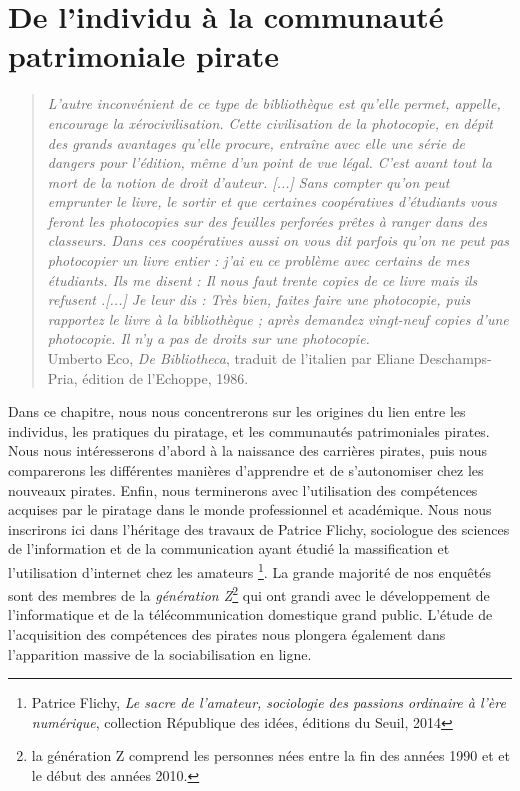 \chapter{De l'individu à la communauté patrimoniale pirate}

\begin{quote}
    \textit{L'autre inconvénient de ce type de bibliothèque est qu'elle permet, appelle, encourage la xérocivilisation. Cette civilisation de la photocopie, en dépit des grands avantages qu'elle procure, entraîne avec elle une série de dangers pour l'édition, même d'un point de vue légal. C'est avant tout la mort de la notion de droit d'auteur. [...] Sans compter qu'on peut emprunter le livre, le sortir et que certaines coopératives d'étudiants vous feront les photocopies sur des feuilles perforées prêtes à ranger dans des classeurs. Dans ces coopératives aussi on vous dit parfois qu'on ne peut pas photocopier un livre entier : j'ai eu ce problème avec certains de mes  étudiants. Ils me disent : \og Il nous faut trente copies de ce livre mais ils refusent \fg.[...] Je leur dis : \og Très bien, faites faire une photocopie, puis rapportez le livre à la bibliothèque ; après demandez vingt-neuf copies d'une photocopie. Il n'y a pas de droits sur une photocopie\fg.}\\

    Umberto Eco, \textit{De Bibliotheca}, traduit de l'italien par Eliane Deschamps-Pria, édition de l'Echoppe, 1986.
\end{quote}

Dans ce chapitre, nous nous concentrerons sur les origines du lien entre les individus, les pratiques du piratage, et les communautés patrimoniales pirates. Nous nous intéresserons d'abord à la naissance des carrières pirates, puis nous comparerons les différentes manières d'apprendre et de s'autonomiser chez les nouveaux pirates. Enfin, nous terminerons avec l'utilisation des compétences acquises par le piratage dans le monde professionnel et académique. Nous nous inscrirons ici dans l'héritage des travaux de Patrice Flichy, sociologue des sciences de l'information et de la communication ayant étudié la massification et l'utilisation d'internet chez les amateurs \footnote{Patrice Flichy, \textit{Le sacre de l'amateur, sociologie des passions ordinaire à l'ère numérique}, collection République des idées, éditions du Seuil, 2014}. La grande majorité de nos enquêtés sont des membres de la \textit{génération Z}\footnote{la génération Z comprend les personnes nées entre la fin des années 1990 et et le début des années 2010.} qui ont grandi avec le développement de l'informatique et de la télécommunication domestique grand public. L'étude de l'acquisition des compétences des pirates nous plongera également dans l'apparition massive de la sociabilisation en ligne.

